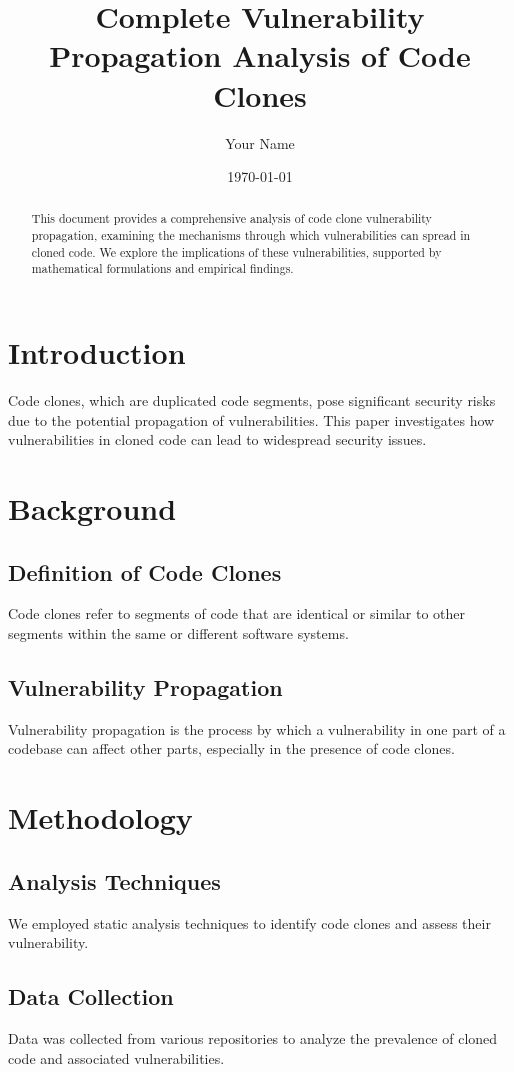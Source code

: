 \documentclass{article}
\title{Complete Vulnerability Propagation Analysis of Code Clones}
\author{Your Name}
\date{\today}
\begin{document}
\maketitle

\begin{abstract}
This document provides a comprehensive analysis of code clone vulnerability propagation, examining the mechanisms through which vulnerabilities can spread in cloned code. We explore the implications of these vulnerabilities, supported by mathematical formulations and empirical findings.
\end{abstract}

\section{Introduction}
Code clones, which are duplicated code segments, pose significant security risks due to the potential propagation of vulnerabilities. This paper investigates how vulnerabilities in cloned code can lead to widespread security issues.

\section{Background}
\subsection{Definition of Code Clones}
Code clones refer to segments of code that are identical or similar to other segments within the same or different software systems.
\subsection{Vulnerability Propagation}
Vulnerability propagation is the process by which a vulnerability in one part of a codebase can affect other parts, especially in the presence of code clones.

\section{Methodology}
\subsection{Analysis Techniques}
We employed static analysis techniques to identify code clones and assess their vulnerability.
\subsection{Data Collection}
Data was collected from various repositories to analyze the prevalence of cloned code and associated vulnerabilities.
\end{document}
